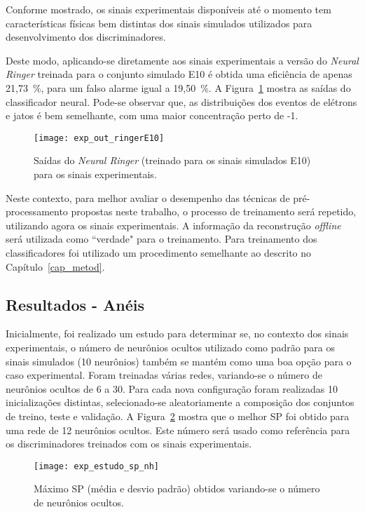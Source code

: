 Conforme mostrado, os sinais experimentais disponíveis até o
momento tem características físicas bem distintas dos sinais
simulados utilizados para desenvolvimento dos discriminadores.

Deste modo, aplicando-se diretamente aos sinais experimentais a
versão do \emph{Neural Ringer} treinada para o conjunto simulado
E10 é obtida uma eficiência de apenas 21,73~\%, para um falso
alarme igual a 19,50~\%. A Figura~\ref{fig_exp_RoutE10} mostra as
saídas do classificador neural. Pode-se observar que, as
distribuições dos eventos de elétrons e jatos é bem semelhante,
com uma maior concentração perto de -1.

\begin{figure}[htb]
\centering
\texttt{[image: exp\_out\_ringerE10]}
\caption{Saídas do \emph{Neural Ringer} (treinado para os sinais
simulados E10) para os sinais experimentais.}
\label{fig_exp_RoutE10}
\end{figure}

 Neste contexto, para melhor avaliar o desempenho das
técnicas de pré-processamento propostas neste trabalho, o processo
de treinamento será repetido, utilizando agora os sinais
experimentais. A informação da reconstrução \emph{offline} será
utilizada como ``verdade" para o treinamento. Para treinamento dos
classificadores foi utilizado um procedimento semelhante ao
descrito no Capítulo~\ref{cap_metod}.

\subsection{Resultados - Anéis}

Inicialmente, foi realizado um estudo para determinar se, no
contexto dos sinais experimentais, o número de neurônios ocultos
utilizado como padrão para os sinais simulados (10 neurônios)
também se mantém como uma boa opção para o caso experimental.
Foram treinadas várias redes, variando-se o número de neurônios
ocultos de 6 a 30. Para cada nova configuração foram realizadas 10
inicializações distintas, selecionado-se aleatoriamente a
composição dos conjuntos de treino, teste e validação. A
Figura~\ref{fig_exp_nh} mostra que o melhor SP foi obtido para uma
rede de 12 neurônios ocultos. Este número será usado como
referência para os discriminadores treinados com os sinais
experimentais.

\begin{figure}[htb]
\centering
\texttt{[image: exp\_estudo\_sp\_nh]}
\caption{Máximo SP (média e desvio padrão) obtidos variando-se o número de neurônios ocultos.}
\label{fig_exp_nh}
\end{figure}

